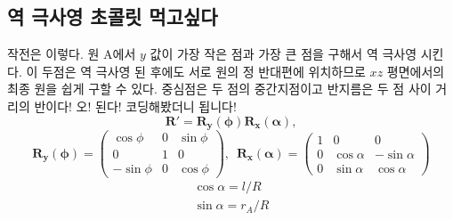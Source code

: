 \documentclass[chapter,a4paper,10pt]{oblivoir}
\begin{document}
\subsection{역 극사영 초콜릿 먹고싶다}
작전은 이렇다. 원 A에서 $y$ 값이 가장 작은 점과 가장 큰 점을 구해서 역 극사영 시킨다.
이 두점은 역 극사영 된 후에도 서로 원의 정 반대편에 위치하므로
$xz$ 평면에서의 최종 원을 쉽게 구할 수 있다.
중심점은 두 점의 중간지점이고 반지름은 두 점 사이 거리의 반이다!
오! 된다! 코딩해봤더니 됩니다!
\begin{equation}
\mathbf{R}' = \mathbf{R_y(\phi)}\mathbf{R_x(\alpha)},
\end{equation}
\begin{equation}
\mathbf{R_y(\phi)} = \left( \begin{array}{ccc}
  \cos \phi & 0 & \sin \phi \\
  0 & 1 & 0 \\
  -\sin \phi & 0 & \cos \phi
\end{array} \right) ,\,\,\,
\mathbf{R_x(\alpha)} = \left( \begin{array}{ccc}
  1 & 0 & 0 \\
  0 & \cos \alpha & -\sin \alpha \\
  0 & \sin \alpha & \cos \alpha
\end{array} \right)
\end{equation}
\begin{equation}
\left. \begin{array}{ll}
\cos \alpha = {l}/{R} \\
\sin \alpha = {r_A}/{R}
\end{array}\right.
\end{equation}
\end{document}
